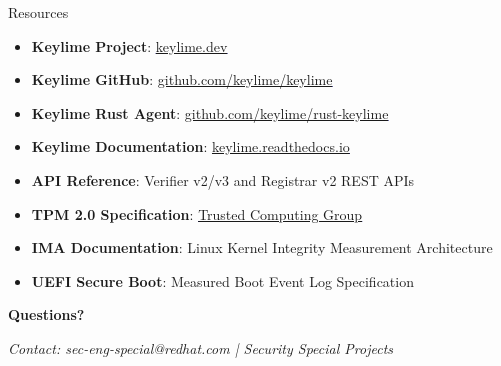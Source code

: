 \begin{frame}{Resources}
  \begin{itemize}
    \item \textbf{Keylime Project}: \textcolor{blue}{\underline{\href{https://keylime.dev/}{keylime.dev}}}
    \item \textbf{Keylime GitHub}: \textcolor{blue}{\underline{\href{https://github.com/keylime/keylime}{github.com/keylime/keylime}}}
    \item \textbf{Keylime Rust Agent}: \textcolor{blue}{\underline{\href{https://github.com/keylime/rust-keylime}{github.com/keylime/rust-keylime}}}
    \item \textbf{Keylime Documentation}: \textcolor{blue}{\underline{\href{https://keylime.readthedocs.io/}{keylime.readthedocs.io}}}
    \item \textbf{API Reference}: Verifier v2/v3 and Registrar v2 REST APIs
    \item \textbf{TPM 2.0 Specification}: \textcolor{blue}{\underline{\href{https://trustedcomputinggroup.org/resource/tpm-library-specification/}{Trusted Computing Group}}}
    \item \textbf{IMA Documentation}: Linux Kernel Integrity Measurement Architecture
    \item \textbf{UEFI Secure Boot}: Measured Boot Event Log Specification
  \end{itemize}

  \vspace{0.5cm}

  \begin{center}
    \Large{\textbf{Questions?}}
  \end{center}

  \vspace{0.3cm}

  \begin{center}
    \scriptsize
    \textit{Contact: sec-eng-special@redhat.com | Security Special Projects}
  \end{center}
\end{frame}
